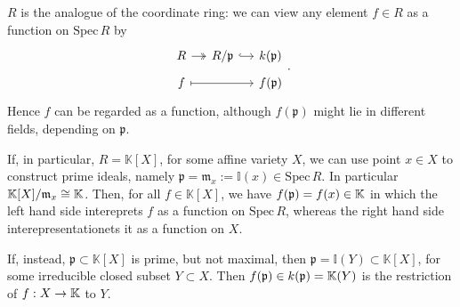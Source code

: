 \begin{rem}[]
	$R$ is the analogue of the coordinate ring:
	we can view any element $f \in R$ as a function on $\mathrm{Spec}\, R$ by
	\begin{equation}
	\begin{tikzcd}[row sep=tiny, column sep=small]
		R \arrow[r, "", twoheadrightarrow] &
		R/\mathfrak{p} \arrow[r, "", hookrightarrow] &
		k(\mathfrak{p})\\
		f \arrow[rr, "", mapsto] && f(\mathfrak{p})
	\end{tikzcd}
	.\end{equation} 
	Hence $f$ can be regarded as a function, although $f(\mathfrak{p})$ might lie
	in different fields, depending on $\mathfrak{p}$.

	If, in particular, $R = \mathbb{K}[X]$, for some affine variety $X$,
	we can use point $x \in X$ to construct prime ideals, namely $\mathfrak{p} = \mathfrak{m}_x := \mathbb{I}\left( x \right) \in \mathrm{Spec}\, R$.
	In particular $\mathbb{K}[X]/\mathfrak{m}_x \cong \mathbb{K}$.
	Then, for all $f \in \mathbb{K}[X]$, we have $f(\mathfrak{p}) = f(x) \in \mathbb{K}$
	in which the left hand side intereprets $f$ as a function on $\mathrm{Spec}\, R$,
	whereas the right hand side interepresentationets it as a function on $X$.

	If, instead, $\mathfrak{p} \subset \mathbb{K}[X]$ is prime, but not maximal, then
	$\mathfrak{p} = \mathbb{I}\left( Y \right) \subset \mathbb{K}[X]$, for
	some irreducible closed subset $Y \subset X$.
	Then $f(\mathfrak{p}) \in k(\mathfrak{p}) = \mathbb{K}(Y)$ is the restriction of
	$f: X \to \mathbb{K}$ to $Y$.
\end{rem}

